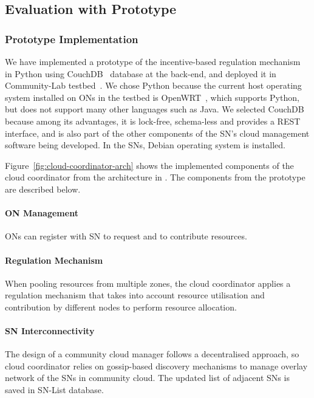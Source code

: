 

\subsection{Evaluation with Prototype}
\label{sec__incentivise_evaluation_prototype}


\subsubsection{Prototype Implementation}

We have implemented a prototype of the incentive-based regulation mechanism~\cite{Khan2014Prototyping} 
in Python using CouchDB~\cite{Anderson2010} database at the back-end,
and deployed it in Community-Lab testbed~\cite{CommunityLab}. 
We chose Python because the current host operating system installed on ONs in the testbed 
is OpenWRT~\cite{Openwrt}, which supports Python, but does not support many other languages such as Java. 
We selected CouchDB because among its advantages, 
it is lock-free, schema-less and provides a REST interface, 
and is also part of the other components of the SN's cloud management software being developed.
In the SNs, Debian operating system is installed. 

Figure~\ref{fig:cloud-coordinator-arch} shows the implemented components of the cloud coordinator from the architecture in .
The components from the prototype are described below.

\paragraph{ON Management} 
ONs can register with SN to request and to contribute resources.

\paragraph{Regulation Mechanism} 
When pooling resources from multiple zones, 
the cloud coordinator applies a regulation mechanism 
that takes into account resource utilisation 
and contribution by different nodes to perform resource allocation. 

\paragraph{SN Interconnectivity} 
The design of a community cloud manager follows a decentralised approach, 
so cloud coordinator relies on gossip-based discovery mechanisms to manage overlay network of the SNs in community cloud. 
The updated list of adjacent SNs is saved in SN-List database.

